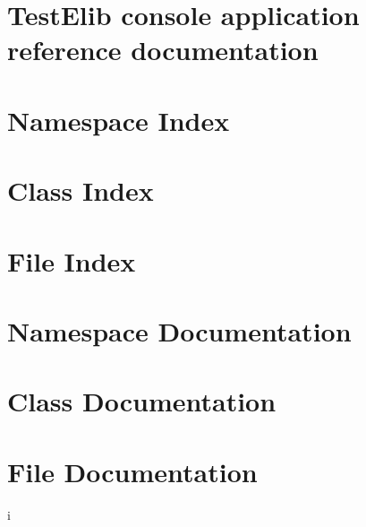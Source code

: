 \chapter{TestElib console application reference documentation} \label{app:testref}
\chapter*{Namespace Index}

\chapter*{Class Index}

\chapter*{File Index}

\chapter*{Namespace Documentation}

\chapter*{Class Documentation}

\chapter*{File Documentation}

i


